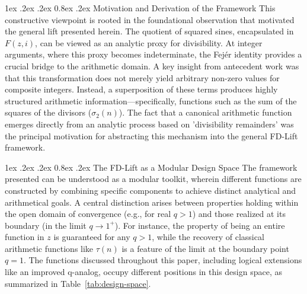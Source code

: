 \documentclass[11pt,a4paper]{amsart}
\makeatletter
\renewcommand\paragraph{\@startsection{paragraph}{4}{\z@}%
  {1ex \@plus .2ex \@minus .2ex}%
  {0.8ex \@plus .2ex}%
  {\normalfont\bfseries}}
\theoremstyle{plain}
\theoremstyle{definition}
\theoremstyle{remark}
\makeatother
\begin{document}
\paragraph{Motivation and Derivation of the Framework}
This constructive viewpoint is rooted in the foundational observation that motivated the general lift presented herein. The quotient of squared sines, encapsulated in $F(z,i)$, can be viewed as an analytic proxy for divisibility. At integer arguments, where this proxy becomes indeterminate, the Fej\'er identity provides a crucial bridge to the arithmetic domain. A key insight from antecedent work was that this transformation does not merely yield arbitrary non-zero values for composite integers. Instead, a superposition of these terms produces highly structured arithmetic information—specifically, functions such as the sum of the squares of the divisors ($\sigma_2(n)$). The fact that a canonical arithmetic function emerges directly from an analytic process based on 'divisibility remainders' was the principal motivation for abstracting this mechanism into the general FD-Lift framework.

\paragraph{The FD-Lift as a Modular Design Space}
The framework presented can be understood as a modular toolkit, wherein different functions are constructed by combining specific components to achieve distinct analytical and arithmetical goals. A central distinction arises between properties holding within the open domain of convergence (e.g., for real $q>1$) and those realized at its boundary (in the limit $q \to 1^+$). For instance, the property of being an entire function in $z$ is guaranteed for any $q>1$, while the recovery of classical arithmetic functions like $\tau(n)$ is a feature of the limit at the boundary point $q=1$. The functions discussed throughout this paper, including logical extensions like an improved q-analog, occupy different positions in this design space, as summarized in Table~\ref{tab:design-space}.
\end{document}
